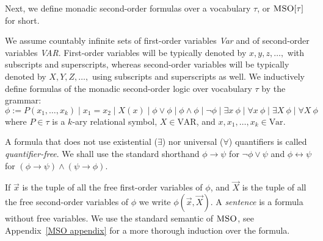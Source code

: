 \documentclass[a4paper,UKenglish,cleveref, autoref, thm-restate]{lipics-v2021}
\newcommand{\MSO}{\textsc{MSO}}
\begin{document}





Next, we deﬁne monadic second-order formulas over a vocabulary $\tau$, or $\MSO[\tau]$ for short. %

\begin{samepage}
\begin{definition}\label{MSO}
We assume countably infinite sets of first-order variables {\em Var}
and of second-order variables {\em VAR}. First-order variables
will be typically denoted by $x, y, z, \ldots,$ with subscripts and superscripts,
whereas second-order variables will be typically denoted by $X, Y, Z, \ldots ,$
using subscripts and superscripts as well. We
inductively define %
formulas of the monadic second-order logic
over vocabulary $\tau$ %
by the grammar:
$$ \phi :=  P(x_1 , \ldots , x_k) \mid x_1 = x_2 \mid X(x) 
		\mid \phi \vee \phi \mid \phi \wedge \phi \mid \neg \phi 
		\mid \exists x ~ \phi \mid  \forall x ~ \phi
		\mid \exists X ~ \phi \mid  \forall X ~ \phi		$$
where $P \in \tau$ is a $k$-ary relational symbol, $X \in \text{VAR}$, and $x, x_1, \ldots, x_k \in \text{Var}$.
\end{definition}
\end{samepage}

A formula that does not use existential ($\exists$) nor universal ($\forall$) quantiﬁers
is called {\em quantifier-free}.
%
%
We shall use the standard shorthand $\phi  \to \psi $ for $ \neg \phi \vee \psi $ 
and $\phi \leftrightarrow \psi $ for
$(\phi  \to \psi ) \wedge (\psi  \to \phi )$. 


If $\overrightarrow{x}$ is the tuple of all the free first-order variables of $\phi$,
and $\overrightarrow{X}$ is the tuple of all the free second-order variables of $\phi$ 
we write $\phi(\overrightarrow{x},\overrightarrow{X})$. A {\em sentence}
is a formula without free variables. We use the standard semantic of $\MSO$,
see Appendix~\ref{MSO appendix} for a more thorough induction over the formula.\\
\end{document}
